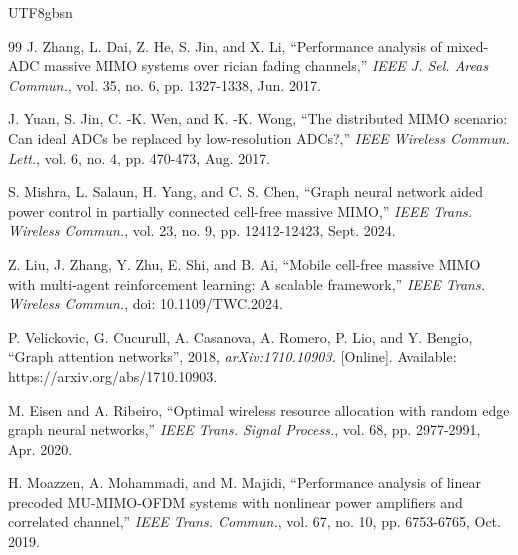 \documentclass[lettersize,journal]{IEEEtran}
\begin{document}
\begin{CJK}{UTF8}{gbsn}
\begin{thebibliography}{99}
J. Zhang, L. Dai, Z. He, S. Jin, and X. Li, “Performance analysis of mixed-ADC massive MIMO systems over rician fading channels,” \textit{IEEE J. Sel. Areas Commun.}, vol. 35, no. 6, pp. 1327-1338, Jun. 2017.

J. Yuan, S. Jin, C. -K. Wen, and K. -K. Wong, “The distributed MIMO scenario: Can ideal ADCs be replaced by low-resolution ADCs?,” \textit{IEEE Wireless Commun. Lett.}, vol. 6, no. 4, pp. 470-473, Aug. 2017.

S. Mishra, L. Salaun, H. Yang, and C. S. Chen, “Graph neural network aided power control in partially connected cell-free massive MIMO,” \emph{IEEE Trans. Wireless Commun.}, vol. 23, no. 9, pp. 12412-12423, Sept. 2024.

Z. Liu, J. Zhang, Y. Zhu, E. Shi, and B. Ai, “Mobile cell-free massive MIMO with multi-agent reinforcement learning: A scalable framework,” \emph{IEEE Trans. Wireless Commun.}, doi: 10.1109/TWC.2024.

P. Velickovic, G. Cucurull, A. Casanova, A. Romero, P. Lio, and Y. Bengio, “Graph attention networks”, 2018, \emph{arXiv:1710.10903.} [Online]. Available: https://arxiv.org/abs/1710.10903.

M. Eisen and A. Ribeiro, “Optimal wireless resource allocation with random edge graph neural networks,” \emph{IEEE Trans. Signal Process.}, vol. 68, pp. 2977-2991, Apr. 2020.

H. Moazzen, A. Mohammadi, and M. Majidi, “Performance analysis of linear precoded MU-MIMO-OFDM systems with nonlinear power amplifiers and correlated channel,” \textit{IEEE Trans. Commun.}, vol. 67, no. 10, pp. 6753-6765, Oct. 2019.










\end{thebibliography}

\end{CJK}
\end{document}
